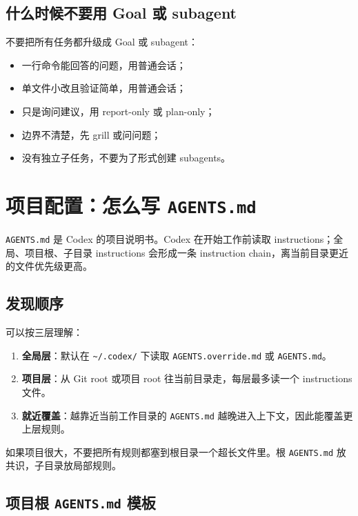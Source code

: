 \documentclass[UTF8,a4paper,11pt,fontset=none]{ctexart}
\newcommand{\file}[1]{\texttt{#1}}
\newcommand{\keypoint}[1]{\textbf{#1}}
\begin{document}
\subsection{什么时候不要用 Goal 或 subagent}

不要把所有任务都升级成 Goal 或 subagent：

\begin{itemize}
  \item 一行命令能回答的问题，用普通会话；
  \item 单文件小改且验证简单，用普通会话；
  \item 只是询问建议，用 report-only 或 plan-only；
  \item 边界不清楚，先 grill 或问问题；
  \item 没有独立子任务，不要为了形式创建 subagents。
\end{itemize}

\section{项目配置：怎么写 \file{AGENTS.md}}

\file{AGENTS.md} 是 Codex 的项目说明书。Codex 在开始工作前读取 instructions；全局、项目根、子目录 instructions 会形成一条 instruction chain，离当前目录更近的文件优先级更高。

\subsection{发现顺序}

可以按三层理解：

\begin{enumerate}
  \item \keypoint{全局层}：默认在 \file{\textasciitilde/.codex/} 下读取 \file{AGENTS.override.md} 或 \file{AGENTS.md}。
  \item \keypoint{项目层}：从 Git root 或项目 root 往当前目录走，每层最多读一个 instructions 文件。
  \item \keypoint{就近覆盖}：越靠近当前工作目录的 \file{AGENTS.md} 越晚进入上下文，因此能覆盖更上层规则。
\end{enumerate}

如果项目很大，不要把所有规则都塞到根目录一个超长文件里。根 \file{AGENTS.md} 放共识，子目录放局部规则。

\subsection{项目根 \file{AGENTS.md} 模板}
\end{document}
